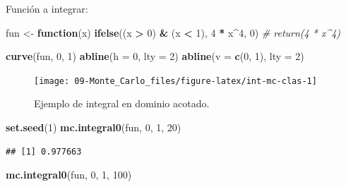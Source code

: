 \documentclass[
]{book}
\newenvironment{Shaded}{\begin{snugshade}}{\end{snugshade}}
\newcommand{\CommentTok}[1]{\textcolor[rgb]{0.56,0.35,0.01}{\textit{#1}}}
\newcommand{\ControlFlowTok}[1]{\textcolor[rgb]{0.13,0.29,0.53}{\textbf{#1}}}
\newcommand{\DataTypeTok}[1]{\textcolor[rgb]{0.13,0.29,0.53}{#1}}
\newcommand{\DecValTok}[1]{\textcolor[rgb]{0.00,0.00,0.81}{#1}}
\newcommand{\KeywordTok}[1]{\textcolor[rgb]{0.13,0.29,0.53}{\textbf{#1}}}
\newcommand{\NormalTok}[1]{#1}
\newcommand{\OperatorTok}[1]{\textcolor[rgb]{0.81,0.36,0.00}{\textbf{#1}}}
\newcommand{\StringTok}[1]{\textcolor[rgb]{0.31,0.60,0.02}{#1}}
\theoremstyle{break}
\theoremstyle{definition}
\theoremstyle{definition}
\theoremstyle{definition}
\theoremstyle{remark}
\begin{document}
Función a integrar:

\begin{Shaded}
\begin{Highlighting}[]
\NormalTok{fun <-}\StringTok{ }\ControlFlowTok{function}\NormalTok{(x) }\KeywordTok{ifelse}\NormalTok{((x }\OperatorTok{>}\StringTok{ }\DecValTok{0}\NormalTok{) }\OperatorTok{&}\StringTok{ }\NormalTok{(x }\OperatorTok{<}\StringTok{ }\DecValTok{1}\NormalTok{), }\DecValTok{4} \OperatorTok{*}\StringTok{ }\NormalTok{x}\OperatorTok{^}\DecValTok{4}\NormalTok{, }\DecValTok{0}\NormalTok{)}
\CommentTok{# return(4 * x^4)}

\KeywordTok{curve}\NormalTok{(fun, }\DecValTok{0}\NormalTok{, }\DecValTok{1}\NormalTok{)}
\KeywordTok{abline}\NormalTok{(}\DataTypeTok{h =} \DecValTok{0}\NormalTok{, }\DataTypeTok{lty =} \DecValTok{2}\NormalTok{)}
\KeywordTok{abline}\NormalTok{(}\DataTypeTok{v =} \KeywordTok{c}\NormalTok{(}\DecValTok{0}\NormalTok{, }\DecValTok{1}\NormalTok{), }\DataTypeTok{lty =} \DecValTok{2}\NormalTok{)}
\end{Highlighting}
\end{Shaded}

\begin{figure}[!htb]

{\centering \texttt{[image: 09-Monte\_Carlo\_files/figure-latex/int-mc-clas-1]} 

}

\caption{Ejemplo de integral en dominio acotado.}\label{fig:int-mc-clas}
\end{figure}

\begin{Shaded}
\begin{Highlighting}[]
\KeywordTok{set.seed}\NormalTok{(}\DecValTok{1}\NormalTok{)}
\KeywordTok{mc.integral0}\NormalTok{(fun, }\DecValTok{0}\NormalTok{, }\DecValTok{1}\NormalTok{, }\DecValTok{20}\NormalTok{)}
\end{Highlighting}
\end{Shaded}

\begin{verbatim}
## [1] 0.977663
\end{verbatim}

\begin{Shaded}
\begin{Highlighting}[]
\KeywordTok{mc.integral0}\NormalTok{(fun, }\DecValTok{0}\NormalTok{, }\DecValTok{1}\NormalTok{, }\DecValTok{100}\NormalTok{)}
\end{Highlighting}
\end{Shaded}
\end{document}
